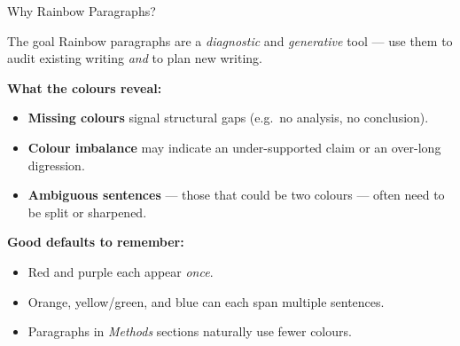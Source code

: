 \documentclass{beamer}
\begin{document}
\begin{frame}{Why Rainbow Paragraphs?}

  \footnotesize
  \begin{block}{The goal}
    Rainbow paragraphs are a \emph{diagnostic} and \emph{generative} tool ---
    use them to audit existing writing \emph{and} to plan new writing.
  \end{block}

  \medskip
  \textbf{What the colours reveal:}
  \begin{itemize}
    \item \textbf{Missing colours} signal structural gaps
      (e.g.\ no {\color{blue}analysis}, no {\color{purple}conclusion}).
    \item \textbf{Colour imbalance} may indicate an under-supported claim
      or an over-long digression.
    \item \textbf{Ambiguous sentences} --- those that could be two colours ---
      often need to be split or sharpened.
  \end{itemize}

  \medskip
  \textbf{Good defaults to remember:}
  \begin{itemize}
    \item {\color{red}Red} and {\color{purple}purple} each appear \emph{once}.
    \item {\color{orange}Orange}, {\color{olive}yellow/green}, and {\color{blue}blue}
      can each span multiple sentences.
    \item Paragraphs in \textit{Methods} sections naturally use fewer colours.
  \end{itemize}

\end{frame}
\end{document}
